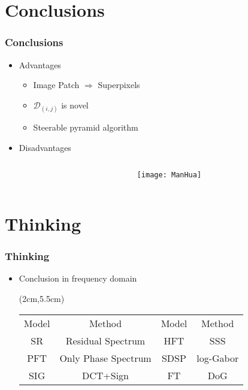 \documentclass[notheorems,serif,table,compress]{beamer}  %
\begin{document}
\section{Conclusions}

\begin{frame}
\frametitle{Conclusions}
\begin{itemize}
\item {\color{blue}Advantages}
\begin{itemize}
\item Image Patch $\Longrightarrow$ Superpixels
\item $\mathcal{D}_{(i,j)}$ is novel
\item Steerable pyramid algorithm
\end{itemize}
\item {\color{blue}Disadvantages}
\begin{itemize}
\begin{columns}
\begin{column}{\leftmargini}
\end{column}
\begin{column}{0.5\linewidth}

\begin{figure}
 \texttt{[image: ManHua]}
\end{figure}

\end{column}
\end{columns}\vspace{1ex}
\end{itemize}
\end{itemize}

\end{frame}

\section{Thinking}
\begin{frame}
\frametitle{Thinking}
\begin{itemize}
\item Conclusion in frequency domain
\begin{textblock*}{10cm}(2cm,5.5cm)
\begin{tabular}{cc|cc}
Model & Method & Model & Method \\
SR & Residual Spectrum & HFT & SSS  \\
PFT & Only Phase Spectrum & SDSP & log-Gabor  \\
SIG & DCT+Sign & FT & DoG
\end{tabular}
\end{textblock*}
\end{itemize}
\end{frame}
\end{document}
